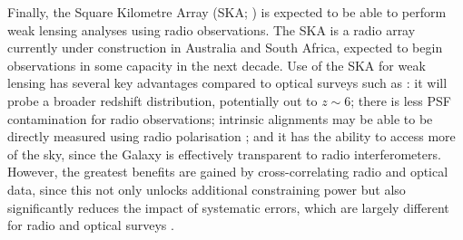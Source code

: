 Finally, the Square Kilometre Array (SKA; \citealt{SKA2020}) is expected to be able to perform weak lensing analyses using radio observations. The SKA is a radio array currently under construction in Australia and South Africa, expected to begin observations in some capacity in the next decade. Use of the SKA for weak lensing has several key advantages compared to optical surveys such as \Euclid{} \citep{Harrison2016}: it will probe a broader redshift distribution, potentially out to $z \sim 6$; there is less PSF contamination for radio observations; intrinsic alignments may be able to be directly measured using radio polarisation \citep{Brown2011, Whittaker2015}; and it has the ability to access more of the sky, since the Galaxy is effectively transparent to radio interferometers. However, the greatest benefits are gained by cross-correlating radio and optical data, since this not only unlocks additional constraining power but also significantly reduces the impact of systematic errors, which are largely different for radio and optical surveys \citep{Camera2017}.


% 

